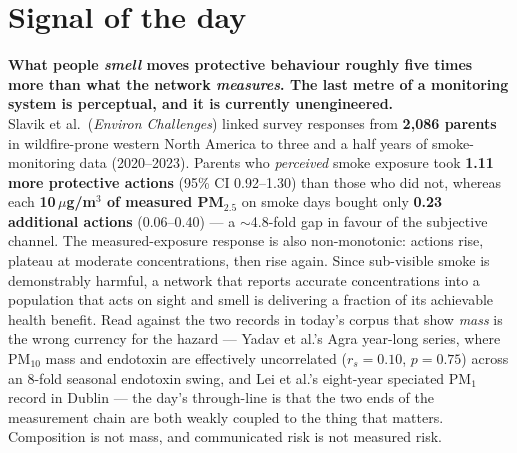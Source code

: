 \documentclass[10pt]{article}
\begin{document}
\vspace{6mm}

\section*{\sffamily\bfseries\color{Deep}Signal of the day}
\vspace{-1.5mm}{\color{Amber}\rule{\linewidth}{1.1pt}}\vspace{2.5mm}

\begin{keybox}
{\sffamily\bfseries\small\color{Deep}What people \emph{smell} moves protective behaviour
roughly five times more than what the network \emph{measures}. The last metre of a
monitoring system is perceptual, and it is currently unengineered.}\\[1.4mm]
\footnotesize
Slavik et al.\ (\textit{Environ Challenges}) linked survey responses from
\textbf{2{,}086 parents} in wildfire-prone western North America to three and a half
years of smoke-monitoring data (2020--2023). Parents who \emph{perceived} smoke exposure
took \textbf{1.11 more protective actions} (95\% CI 0.92--1.30) than those who did not,
whereas each \textbf{10\,$\mu$g/m$^3$ of measured PM$_{2.5}$} on smoke days bought only
\textbf{0.23 additional actions} (0.06--0.40) --- a $\sim$4.8-fold gap in favour of the
subjective channel. The measured-exposure response is also non-monotonic: actions rise,
plateau at moderate concentrations, then rise again. Since sub-visible smoke is
demonstrably harmful, a network that reports accurate concentrations into a population
that acts on sight and smell is delivering a fraction of its achievable health benefit.
Read against the two records in today's corpus that show \emph{mass} is the wrong
currency for the hazard --- Yadav et al.'s Agra year-long series, where PM$_{10}$ mass and
endotoxin are effectively uncorrelated ($r_s=0.10$, $p=0.75$) across an 8-fold seasonal
endotoxin swing, and Lei et al.'s eight-year speciated PM$_1$ record in Dublin --- the
day's through-line is that the two ends of the measurement chain are both weakly coupled
to the thing that matters. Composition is not mass, and communicated risk is not
measured risk.
\end{keybox}

\vspace{3mm}

\enlargethispage{2\baselineskip}
\end{document}
